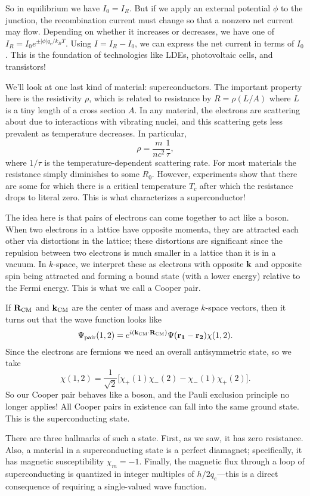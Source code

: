 \documentclass[../p052main.tex]{subfiles}
\begin{document}
So in equilibrium we have $I_0 = I_R$.
But if we apply an external potential $\phi$ to the junction, the recombination current must change so that a nonzero net current may flow.
Depending on whether it increases or decreases, we have one of $I_R = I_0 e^{\pm |\phi| q_e / k_B T}$.
Using $I = I_R - I_0$, we can express the net current in terms of $I_0$.
This is the foundation of technologies like LDEs, photovoltaic cells, and transistors!

We'll look at one last kind of material: superconductors.
The important property here is the resistivity $\rho$, which is related to resistance by $R = \rho (L / A)$ where $L$ is a tiny length of a cross section $A$.
In any material, the electrons are scattering about due to interactions with vibrating nuclei, and this scattering gets less prevalent as temperature decreases.
In particular,
\[ \rho = \frac{m}{nc^2} \frac{1}{\tau}, \]
where $1 / \tau$ is the temperature-dependent scattering rate.
For most materials the resistance simply diminishes to some $R_0$.
However, experiments show that there are some for which there is a critical temperature $T_c$ after which the resistance drops to literal zero.
This is what characterizes a superconductor!

The idea here is that pairs of electrons can come together to act like a boson.
When two electrons in a lattice have opposite momenta, they are attracted each other via distortions in the lattice; these distortions are significant since the repulsion between two electrons is much smaller in a lattice than it is in a vacuum.
In $k$-space, we interpret these as electrons with opposite $\mathbf{k}$ and opposite spin being attracted and forming a bound state (with a lower energy) relative to the Fermi energy.
This is what we call a Cooper pair.

If $\mathbf{R}_\textrm{CM}$ and $\mathbf{k}_\textrm{CM}$ are the center of mass and average $k$-space vectors, then it turns out that the wave function looks like
\[ \Psi_\textrm{pair}(1,2) = e^{i (\mathbf{k}_\textrm{CM} \cdot \mathbf{R}_\textrm{CM})} \Psi(\mathbf{\mathbf{r}_1 - \mathbf{r}_2}) \chi(1,2). \]
Since the electrons are fermions we need an overall antisymmetric state, so we take
\[ \chi(1,2) = \frac{1}{\sqrt{2}} \big[ \chi_+(1)\chi_-(2) - \chi_-(1) \chi_+(2) \big]. \]
So our Cooper pair behaves like a boson, and the Pauli exclusion principle no longer applies!
All Cooper pairs in existence can fall into the same ground state.
This is the superconducting state.

There are three hallmarks of such a state.
First, as we saw, it has zero resistance.
Also, a material in a superconducting state is a perfect diamagnet; specifically, it has magnetic susceptibility $\chi_m = -1$.
Finally, the magnetic flux through a loop of superconducting is quantized in integer multiples of $h / 2q_e$---this is a direct consequence of requiring a single-valued wave function.
\end{document}
